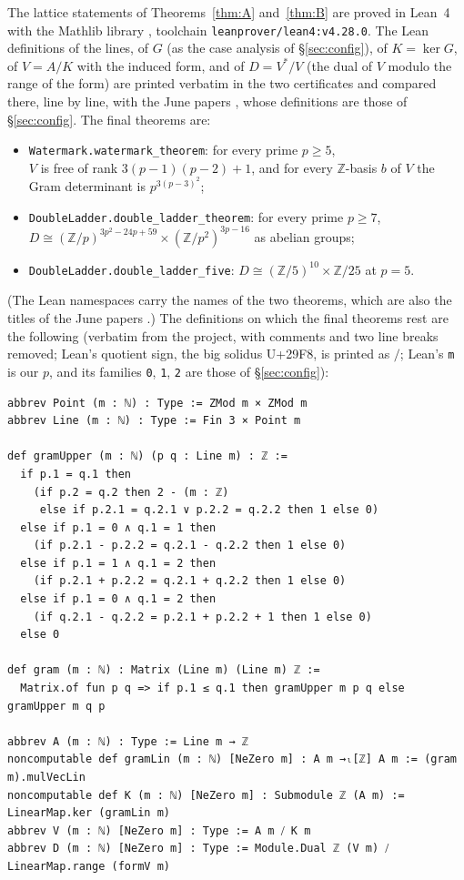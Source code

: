 \documentclass[11pt]{article}
\theoremstyle{definition}
\theoremstyle{remark}
\newcommand{\Z}{\mathbb{Z}}
\begin{document}
The lattice statements of Theorems~\ref{thm:A} and~\ref{thm:B} are proved in Lean~4 \cite{Lean} with the Mathlib library \cite{Mathlib}, toolchain \texttt{leanprover/lean4:v4.28.0}. The Lean definitions of the lines, of $G$ (as the case analysis of \S\ref{sec:config}), of $K=\ker G$, of $V=A/K$ with the induced form, and of $D=V^\ast/V$ (the dual of $V$ modulo the range of the form) are printed verbatim in the two certificates \cite{WMLean,DLLean} and compared there, line by line, with the June papers \cite{WM,DL}, whose definitions are those of \S\ref{sec:config}. The final theorems are:
\begin{itemize}
\item \texttt{Watermark.watermark\_theorem}: for every prime $p\ge5$,\\ $V$ is free of rank $3(p-1)(p-2)+1$, and for every $\Z$-basis $b$ of $V$ the Gram determinant is $p^{3(p-3)^2}$;
\item \texttt{DoubleLadder.\allowbreak double\_ladder\_theorem}: for every prime $p\ge7$,\\ $D\cong(\Z/p)^{3p^2-24p+59}\times(\Z/p^2)^{3p-16}$ as abelian groups;
\item \texttt{DoubleLadder.double\_ladder\_five}: $D\cong(\Z/5)^{10}\times\Z/25$ at $p=5$.
\end{itemize}
(The Lean namespaces carry the names of the two theorems, which are also the titles of the June papers \cite{WM,DL}.)
The definitions on which the final theorems rest are the following (verbatim from the project, with comments and two line breaks removed; Lean's quotient sign, the big solidus U+29F8, is printed as $/$; Lean's \texttt{m} is our $p$, and its families \texttt{0}, \texttt{1}, \texttt{2} are those of \S\ref{sec:config}):
\begin{lstlisting}
abbrev Point (m : ℕ) : Type := ZMod m × ZMod m
abbrev Line (m : ℕ) : Type := Fin 3 × Point m

def gramUpper (m : ℕ) (p q : Line m) : ℤ :=
  if p.1 = q.1 then
    (if p.2 = q.2 then 2 - (m : ℤ)
     else if p.2.1 = q.2.1 ∨ p.2.2 = q.2.2 then 1 else 0)
  else if p.1 = 0 ∧ q.1 = 1 then
    (if p.2.1 - p.2.2 = q.2.1 - q.2.2 then 1 else 0)
  else if p.1 = 1 ∧ q.1 = 2 then
    (if p.2.1 + p.2.2 = q.2.1 + q.2.2 then 1 else 0)
  else if p.1 = 0 ∧ q.1 = 2 then
    (if q.2.1 - q.2.2 = p.2.1 + p.2.2 + 1 then 1 else 0)
  else 0

def gram (m : ℕ) : Matrix (Line m) (Line m) ℤ :=
  Matrix.of fun p q => if p.1 ≤ q.1 then gramUpper m p q else gramUpper m q p

abbrev A (m : ℕ) : Type := Line m → ℤ
noncomputable def gramLin (m : ℕ) [NeZero m] : A m →ₗ[ℤ] A m := (gram m).mulVecLin
noncomputable def K (m : ℕ) [NeZero m] : Submodule ℤ (A m) := LinearMap.ker (gramLin m)
abbrev V (m : ℕ) [NeZero m] : Type := A m ⧸ K m
abbrev D (m : ℕ) [NeZero m] : Type := Module.Dual ℤ (V m) ⧸ LinearMap.range (formV m)
\end{lstlisting}
\end{document}
